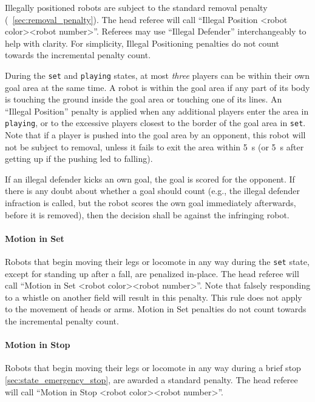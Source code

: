 Illegally positioned robots are subject to the standard removal penalty (\cf~\cref{sec:removal_penalty}). The head referee will call ``Illegal Position \textless robot color\textgreater \textless robot number\textgreater''. Referees may use ``Illegal Defender'' interchangeably to help with clarity. 
For simplicity, Illegal Positioning penalties do not count towards the incremental penalty count.

During the \texttt{set} and \texttt{playing} states, at most \textit{three} players can be within their own goal area at the same time. A robot is within the goal area if any part of its body is touching the ground inside the goal area or touching one of its lines. An ``Illegal Position'' penalty is applied when any additional players enter the area in \texttt{playing}, or to the excessive players closest to the border of the goal area in \texttt{set}. Note that if a player is pushed into the goal area by an opponent, this robot will not be subject to removal, unless it fails to exit the area within \qty{5}{\second} (or \qty{5}{\second} after getting up if the pushing led to falling).

If an illegal defender kicks an own goal, the goal is scored for the opponent. If there is any doubt about whether a goal should count (e.g., the illegal defender infraction is called, but the robot scores the own goal immediately afterwards, before it is removed), then the decision shall be against the infringing robot.

\paragraph{Motion in Set}
\label{sec:motion_in_set}

Robots that begin moving their legs or locomote in any way during the \texttt{set} state, except for standing up after a fall, are penalized in-place. The head referee will call ``Motion in Set \textless robot color\textgreater \textless robot number\textgreater''. Note that falsely responding to a whistle on another field will result in this penalty. This rule does not apply to the movement of heads or arms. Motion in Set penalties do not count towards the incremental penalty count.

\paragraph{Motion in Stop}
\label{sec:motion_in_stop}

Robots that begin moving their legs or locomote in any way during a brief stop \cref{sec:state_emergency_stop}, are awarded a standard penalty. The head referee will call ``Motion in Stop \textless robot color\textgreater \textless robot number\textgreater''.

